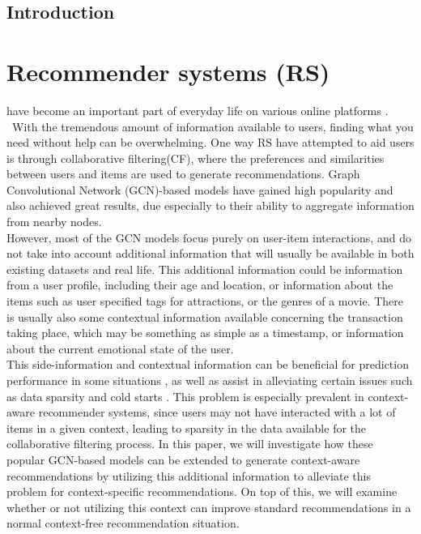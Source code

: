 \noindent
\section{Introduction}
\chapter{Recommender systems (RS)}\label{ch:introduction}
have become an important part of everyday life on various online platforms \cite{youtuberecommendation, industryperspective}.\\\
With the tremendous amount of information available to users, finding what you need without help can be overwhelming.
One way RS have attempted to aid users is through collaborative filtering(CF), where the preferences and similarities between users and items are used to generate recommendations. 
Graph Convolutional Network (GCN)-based models \cite{NGCF,LightGCN,KGAT} have gained high popularity and also achieved great results, due especially to their ability to aggregate information from nearby nodes.\\
However, most of the GCN models focus purely on user-item interactions, and do not take into account additional information that will usually be available in both existing datasets and real life.
This additional information could be information from a user profile, including their age and location, or information about the items such as user specified tags for attractions, or the genres of a movie.
There is usually also some contextual information available concerning the transaction taking place, which may be something as simple as a timestamp, or information about the current emotional state of the user.\\
This side-information and contextual information can be beneficial for prediction performance in some situations \cite{ContextImportance, ContextImportance2, ContextImportance3}, as well as assist in alleviating certain issues such as data sparsity and cold starts \cite{SIdeInforImportance}.
This problem is especially prevalent in context-aware recommender systems, since users may not have interacted with a lot of items in a given context, leading to sparsity in the data available for the collaborative filtering process.
In this paper, we will investigate how these popular GCN-based models can be extended to generate context-aware recommendations by utilizing this additional information to alleviate this problem for context-specific recommendations.
On top of this, we will examine whether or not utilizing this context can improve standard recommendations in a normal context-free recommendation situation.
